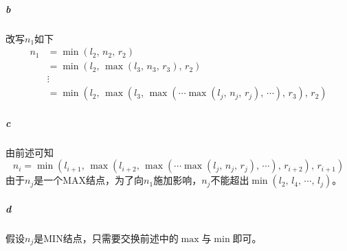 \documentclass{article}
\begin{document}
\subparagraph{b}
改写$n_1$如下
\begin{align*}
    n_1 &= \min(l_2,\, n_2,\, r_2) \\
    &= \min(l_2,\, \max(l_3,\, n_3,\, r_3),\, r_2) \\
    &\vdots \\
    &= \min(l_2,\, \max(l_3,\, \max( \cdots \max(l_j,\, n_j,\, r_j),\, \cdots),\, r_3),\, r_2)
\end{align*}

\subparagraph{c}
由前述可知
\begin{equation*}
    n_i = \min(l_{i + 1},\, \max(l_{i + 2},\, \max( \cdots \max(l_j,\, n_j,\, r_j),\, \cdots),\, r_{i + 2}),\, r_{i + 1})
\end{equation*}
由于$n_j$是一个MAX结点，为了向$n_1$施加影响，$n_j$不能超出$\min(l_2,\, l_4,\, \cdots,\, l_j)$。

\subparagraph{d}
假设$n_j$是MIN结点，只需要交换前述中的$\max$与$\min$即可。
\end{document}
